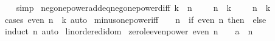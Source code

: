 \begin{isabellebody}
%
\isadelimproof
\ \ %
\endisadelimproof
%
\isatagproof
{}\isamarkupfalse%
\ simp%
\endisatagproof
{\isafoldproof}%
%
\isadelimproof
\isanewline
%
\endisadelimproof
\isanewline
{}\isamarkupfalse%
\ neg{\isacharunderscore}{\kern0pt}one{\isacharunderscore}{\kern0pt}power{\isacharunderscore}{\kern0pt}add{\isacharunderscore}{\kern0pt}eq{\isacharunderscore}{\kern0pt}neg{\isacharunderscore}{\kern0pt}one{\isacharunderscore}{\kern0pt}power{\isacharunderscore}{\kern0pt}diff{\isacharcolon}{\kern0pt}\ {\isachardoublequoteopen}k\ {\isasymle}\ n\ {\isasymLongrightarrow}\ {\isacharparenleft}{\kern0pt}{\isacharminus}{\kern0pt}\ {}{\isacharparenright}{\kern0pt}\ {\isacharcircum}{\kern0pt}\ {\isacharparenleft}{\kern0pt}n\ {\isacharplus}{\kern0pt}\ k{\isacharparenright}{\kern0pt}\ {\isacharequal}{\kern0pt}\ {\isacharparenleft}{\kern0pt}{\isacharminus}{\kern0pt}\ {}{\isacharparenright}{\kern0pt}\ {\isacharcircum}{\kern0pt}\ {\isacharparenleft}{\kern0pt}n\ {\isacharminus}{\kern0pt}\ k{\isacharparenright}{\kern0pt}{\isachardoublequoteclose}\isanewline
%
\isadelimproof
\ \ %
\endisadelimproof
%
\isatagproof
{}\isamarkupfalse%
\ {\isacharparenleft}{\kern0pt}cases\ {\isachardoublequoteopen}even\ {\isacharparenleft}{\kern0pt}n\ {\isacharplus}{\kern0pt}\ k{\isacharparenright}{\kern0pt}{\isachardoublequoteclose}{\isacharparenright}{\kern0pt}\ auto%
\endisatagproof
{\isafoldproof}%
%
\isadelimproof
\isanewline
%
\endisadelimproof
\isanewline
{}\isamarkupfalse%
\ minus{\isacharunderscore}{\kern0pt}one{\isacharunderscore}{\kern0pt}power{\isacharunderscore}{\kern0pt}iff{\isacharcolon}{\kern0pt}\ {\isachardoublequoteopen}{\isacharparenleft}{\kern0pt}{\isacharminus}{\kern0pt}\ {}{\isacharparenright}{\kern0pt}\ {\isacharcircum}{\kern0pt}\ n\ {\isacharequal}{\kern0pt}\ {\isacharparenleft}{\kern0pt}if\ even\ n\ then\ {}\ else\ {\isacharminus}{\kern0pt}\ {}{\isacharparenright}{\kern0pt}{\isachardoublequoteclose}\isanewline
%
\isadelimproof
\ \ %
\endisadelimproof
%
\isatagproof
{}\isamarkupfalse%
\ {\isacharparenleft}{\kern0pt}induct\ n{\isacharparenright}{\kern0pt}\ auto%
\endisatagproof
{\isafoldproof}%
%
\isadelimproof
\isanewline
%
\endisadelimproof
\isanewline
{}\isamarkupfalse%
\isanewline
\isanewline
{}\isamarkupfalse%
\ linordered{\isacharunderscore}{\kern0pt}idom\isanewline
{}\isanewline
\isanewline
{}\isamarkupfalse%
\ zero{\isacharunderscore}{\kern0pt}le{\isacharunderscore}{\kern0pt}even{\isacharunderscore}{\kern0pt}power{\isacharcolon}{\kern0pt}\ {\isachardoublequoteopen}even\ n\ {\isasymLongrightarrow}\ {}\ {\isasymle}\ a\ {\isacharcircum}{\kern0pt}\ n{\isachardoublequoteclose}\isanewline

\end{isabellebody}
